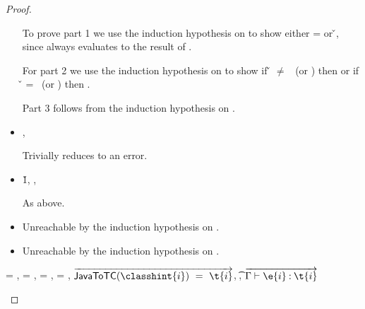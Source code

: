 \begin{lemma}
\begin{proof}
\begin{case}[T-Do]
\begin{itemize}
\begin{subcase}[B-Do]
To prove part 1 we use the induction hypothesis on 
to show either \object{} = \emptyobject{} 
or \inopenv {\openv{}} {\object{}} {\v{}}, since \e{} always
evaluates to the result of .

For part 2 we use the induction hypothesis on 
to show if \v{} $\not=$ \false\ (or \nil) then
        {\satisfies{\openv{}}{\thenprop{\prop{}}}}
        or
  if \v{} = \false\ (or \nil) then
        {\satisfies{\openv{}}{\elseprop{\prop{}}}}.

Part 3 follows from the induction hypothesis on .
    \end{subcase}
  \item[]

\begin{subcase}[BE-Do1]
  \opsem {\openv{}} {} {},
  \opsem {\openv{}} {\e{}} {\errorval{\v{}}}

        Trivially reduces to an error.
\end{subcase}
  \item[]
\begin{subcase}[BE-Do2]
  \opsem {\openv{}} {} {\v{1}},
  \opsem {\openv{}} {} {\errorvalv{}},
  \opsem {\openv{}} {\e{}} {\errorvalv{}}

        As above.
\end{subcase}
  \item[]

\begin{subcase}[BW-Do1]
  Unreachable by the induction hypothesis on .
\end{subcase}
  \item[]

\begin{subcase}[BW-Do2]
  Unreachable by the induction hypothesis on .
\end{subcase}
\end{itemize}
\end{case}

\begin{case}[T-NewStatic]
  \e{} = { {\classhint{}} 
                                                          {\class{}} {}},
  \object{} = \emptyobject{},
\thenprop{\prop{}} = \topprop{},
\elseprop{\prop{}} = \botprop{},
   $\overrightarrow{
\javatotc {\classhint{i}}
          {\t{i}}
          }$,
  \javatotc {\classhint{}}
            {\t{}},
            $
  \overrightarrow{
  \judgementtwo {\propenv{}}
                    {\hastype {\e{i}} {\t{i}}}
                  }$


\end{case}
\end{proof}
\end{lemma}

